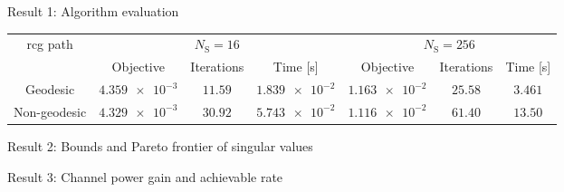 \documentclass[final,xcolor={table}]{beamer}
\DeclareMathOperator{\rank}{rank}
\newlength{\sepwidth}
\newlength{\colwidth}
\newcommand{\separatorcolumn}{\begin{column}{\sepwidth}\end{column}}
\begin{document}
\begin{frame}[t]
\begin{columns}[t]
\begin{column}{\colwidth}
			\begin{exampleblock}{Result 1: Algorithm evaluation}
				\begin{table}[!t]
					\centering
					\begin{tabular}{ccccccc}
						\toprule
						\multirow{2}{*}{\gls{rcg} path} & \multicolumn{3}{c}{$N_\mathrm{S}=16$} & \multicolumn{3}{c}{$N_\mathrm{S}=256$}                                                                     \\ \cmidrule(lr){2-4} \cmidrule(lr){5-7}
														& Objective                             & Iterations                               & Time [s]         & Objective        & Iterations   & Time [s]   \\ \midrule
						Geodesic                        & $\num{4.359e-3}$                      & $11.59$                                  & $\num{1.839e-2}$ & $\num{1.163e-2}$ & $25.58$      & $3.461$    \\
						Non-geodesic                    & $\num{4.329e-3}$                      & $30.92$                                  & $\num{5.743e-2}$ & $\num{1.116e-2}$ & $61.40$      & $13.50$    \\ \bottomrule
					\end{tabular}
				\end{table}
			\end{exampleblock}

			\begin{exampleblock}{Result 2: Bounds and Pareto frontier of singular values}
				\begin{figure}[!t]
					\centering
					\subfloat[Analytical vs numerical results: $4 \times 128 \times 4, \rank(\mathbf{H}_\mathrm{F}) = 2$]{
						\resizebox{0.485\linewidth}{!}{
							
						}
					}
				\end{figure}
			\end{exampleblock}

			\begin{exampleblock}{Result 3: Channel power gain and achievable rate}
				\begin{figure}[!t]
					\centering
				\end{figure}

			\end{exampleblock}
		\end{column}

		\separatorcolumn
	\end{columns}
\end{frame}
\end{document}
